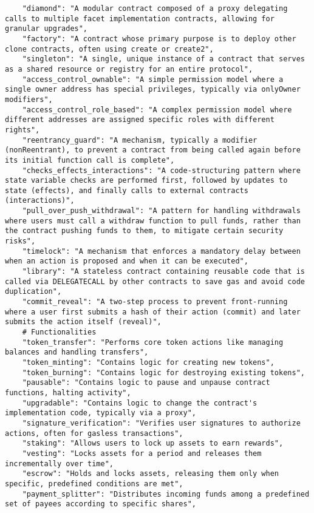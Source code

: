 \begin{lstlisting}
    "diamond": "A modular contract composed of a proxy delegating calls to multiple facet implementation contracts, allowing for granular upgrades",
    "factory": "A contract whose primary purpose is to deploy other clone contracts, often using create or create2",
    "singleton": "A single, unique instance of a contract that serves as a shared resource or registry for an entire protocol",
    "access_control_ownable": "A simple permission model where a single owner address has special privileges, typically via onlyOwner modifiers",
    "access_control_role_based": "A complex permission model where different addresses are assigned specific roles with different rights",
    "reentrancy_guard": "A mechanism, typically a modifier (nonReentrant), to prevent a contract from being called again before its initial function call is complete",
    "checks_effects_interactions": "A code-structuring pattern where state variable checks are performed first, followed by updates to state (effects), and finally calls to external contracts (interactions)",
    "pull_over_push_withdrawal": "A pattern for handling withdrawals where users must call a withdraw function to pull funds, rather than the contract pushing funds to them, to mitigate certain security risks",
    "timelock": "A mechanism that enforces a mandatory delay between when an action is proposed and when it can be executed",
    "library": "A stateless contract containing reusable code that is called via DELEGATECALL by other contracts to save gas and avoid code duplication",
    "commit_reveal": "A two-step process to prevent front-running where a user first submits a hash of their action (commit) and later submits the action itself (reveal)",
    # Functionalities
    "token_transfer": "Performs core token actions like managing balances and handling transfers",
    "token_minting": "Contains logic for creating new tokens",
    "token_burning": "Contains logic for destroying existing tokens",
    "pausable": "Contains logic to pause and unpause contract functions, halting activity",
    "upgradable": "Contains logic to change the contract's implementation code, typically via a proxy",
    "signature_verification": "Verifies user signatures to authorize actions, often for gasless transactions",
    "staking": "Allows users to lock up assets to earn rewards",
    "vesting": "Locks assets for a period and releases them incrementally over time",
    "escrow": "Holds and locks assets, releasing them only when specific, predefined conditions are met",
    "payment_splitter": "Distributes incoming funds among a predefined set of payees according to specific shares",

\end{lstlisting}

